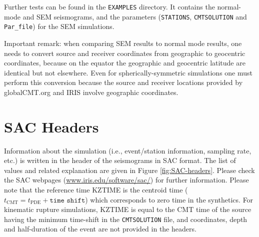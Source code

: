 \documentclass[oneside,english]{book}
\newcommand{\urlwithparentheses}[1]{(\url{#1})}
\begin{document}
Further tests can be found in the \texttt{EXAMPLES} directory. It
contains the normal-mode and SEM seismograms, and the parameters (\texttt{STATIONS},
\texttt{CMTSOLUTION} and \texttt{Par\_file}) for the SEM simulations.

Important remark: when comparing SEM results to normal mode results, one needs to
convert source and receiver coordinates from geographic to geocentric coordinates,
because on the equator the geographic and
geocentric latitude are identical but not elsewhere. Even for
spherically-symmetric simulations one must perform this conversion
because the source and receiver locations provided by globalCMT.org and
IRIS involve geographic coordinates.

\chapter{\label{cha:SAC-headers}SAC Headers}

Information about the simulation (i.e., event/station information, sampling rate, etc.) is written in the header of the seismograms in SAC format. The list of values and related explanation are given in Figure \ref{fig:SAC-headers}. Please check the SAC webpages \urlwithparentheses{www.iris.edu/software/sac/} for further information. Please note that the reference time KZTIME is the centroid time ($t_\text{CMT}=t_\text{PDE}+\texttt{time shift}$) which corresponds to zero time in the synthetics. For kinematic rupture simulations, KZTIME is equal to the CMT time of the source having the minimum time-shift in the \texttt{CMTSOLUTION} file, and coordinates, depth and half-duration of the event are not provided in the headers.
\end{document}
